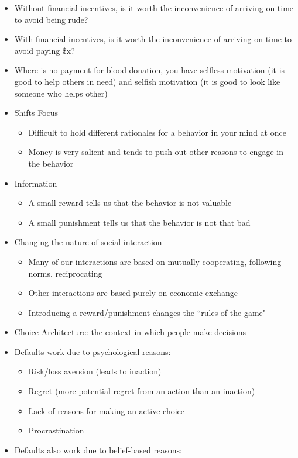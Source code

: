 \documentclass[12pt]{article}
\begin{document}
\begin{itemize}
\item Without financial incentives, is it worth the inconvenience of arriving on time to avoid being rude? 
\item With financial incentives, is it worth the inconvenience of arriving on time to avoid paying \$x? 
\item Where is no payment for blood donation, you have selfless motivation (it is good to help others in need) and selfish motivation (it is good to look like someone who helps other) 
\item Shifts Focus \begin{itemize} 
\item Difficult to hold different rationales for a behavior in your mind at once 
\item Money is very salient and tends to push out other reasons to engage in the behavior \end{itemize} 
\item Information \begin{itemize} 
\item A small reward tells us that the behavior is not valuable 
\item A small punishment tells us that the behavior is not that bad \end{itemize} 
\item Changing the nature of social interaction \begin{itemize} 
\item Many of our interactions are based on mutually cooperating, following norms, reciprocating 
\item Other interactions are based purely on economic exchange 
\item Introducing a reward/punishment changes the ``rules of the game" \end{itemize} 
\item Choice Architecture: the context in which people make decisions 
\item Defaults work due to psychological reasons: \begin{itemize} 
\item Risk/loss aversion (leads to inaction) 
\item Regret (more potential regret from an action than an inaction)
\item Lack of reasons for making an active choice 
\item Procrastination \end{itemize} 
\item Defaults also work due to belief-based reasons: \begin{itemize}

\end{itemize}
\end{itemize}
\end{document}
